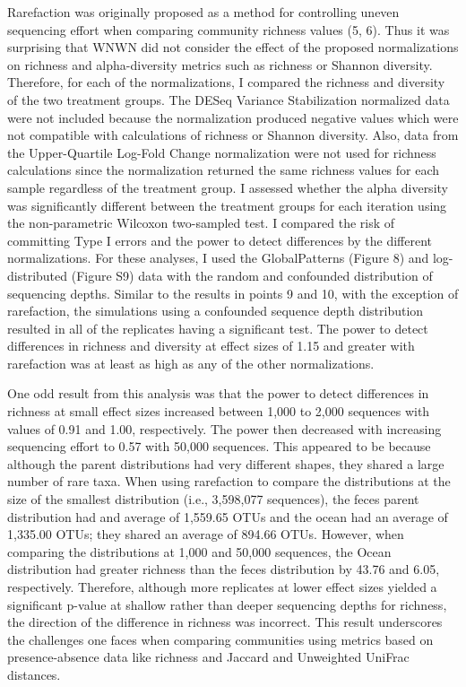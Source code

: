 \documentclass[
]{article}
\begin{document}
Rarefaction was originally proposed as a method for controlling uneven
sequencing effort when comparing community richness values (5, 6). Thus
it was surprising that WNWN did not consider the effect of the proposed
normalizations on richness and alpha-diversity metrics such as richness
or Shannon diversity. Therefore, for each of the normalizations, I
compared the richness and diversity of the two treatment groups. The
DESeq Variance Stabilization normalized data were not included because
the normalization produced negative values which were not compatible
with calculations of richness or Shannon diversity. Also, data from the
Upper-Quartile Log-Fold Change normalization were not used for richness
calculations since the normalization returned the same richness values
for each sample regardless of the treatment group. I assessed whether
the alpha diversity was significantly different between the treatment
groups for each iteration using the non-parametric Wilcoxon two-sampled
test. I compared the risk of committing Type I errors and the power to
detect differences by the different normalizations. For these analyses,
I used the GlobalPatterns (Figure 8) and log-distributed (Figure S9)
data with the random and confounded distribution of sequencing depths.
Similar to the results in points 9 and 10, with the exception of
rarefaction, the simulations using a confounded sequence depth
distribution resulted in all of the replicates having a significant
test. The power to detect differences in richness and diversity at
effect sizes of 1.15 and greater with rarefaction was at least as high
as any of the other normalizations.

One odd result from this analysis was that the power to detect
differences in richness at small effect sizes increased between 1,000 to
2,000 sequences with values of 0.91 and 1.00, respectively. The power
then decreased with increasing sequencing effort to 0.57 with 50,000
sequences. This appeared to be because although the parent distributions
had very different shapes, they shared a large number of rare taxa. When
using rarefaction to compare the distributions at the size of the
smallest distribution (i.e., 3,598,077 sequences), the feces parent
distribution had and average of 1,559.65 OTUs and the ocean had an
average of 1,335.00 OTUs; they shared an average of 894.66 OTUs.
However, when comparing the distributions at 1,000 and 50,000 sequences,
the Ocean distribution had greater richness than the feces distribution
by 43.76 and 6.05, respectively. Therefore, although more replicates at
lower effect sizes yielded a significant p-value at shallow rather than
deeper sequencing depths for richness, the direction of the difference
in richness was incorrect. This result underscores the challenges one
faces when comparing communities using metrics based on presence-absence
data like richness and Jaccard and Unweighted UniFrac distances.
\end{document}
